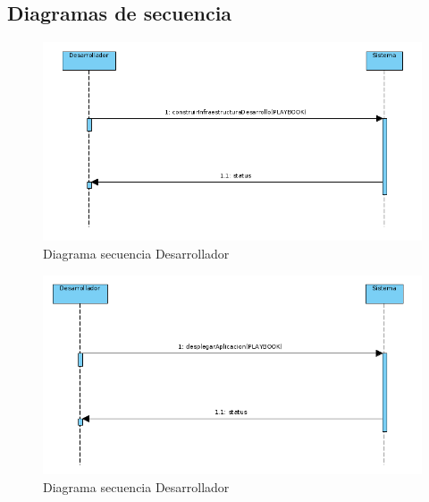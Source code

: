 	\subsection{Diagramas de secuencia}
		\begin{figure}[!hbt]
			\centering
			\includegraphics[scale=0.4]{imagenes/Analisis/diagrama_secuencia_desarrollador_1.png}
			\caption[Diagrama secuencia Desarrollador]{Diagrama secuencia Desarrollador \cite{diagramasecuencia:online}} 
			\label{Diagrama secuencia}
		\end{figure}
		\clearpage
	
		\begin{figure}[!hbt]
			\centering
			\includegraphics[scale=0.4]{imagenes/Analisis/diagrama_secuencia_desarrollador_4.png}
			\caption[Diagrama secuencia Desarrollador]{Diagrama secuencia Desarrollador \cite{diagramasecuencia:online}} 
			\label{Diagrama secuencia}
		\end{figure}

